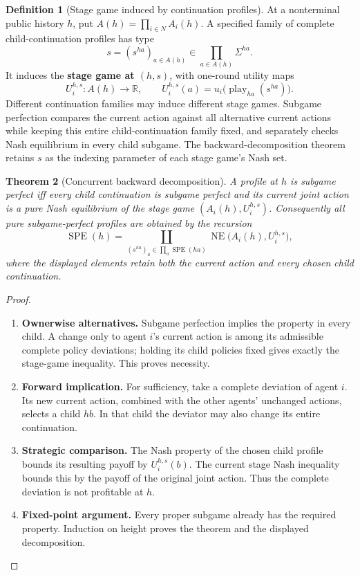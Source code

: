 \documentclass[11pt,a4paper]{article}
\numberwithin{equation}{section}
\newtheorem{theorem}{Theorem}[section]
\theoremstyle{definition}
\newtheorem{definition}[theorem]{Definition}
\theoremstyle{remark}
\theoremstyle{plain}
\begin{document}
\begin{definition}[Stage game induced by continuation profiles]
\label{def:egt-stage-game-induced-by-continuation-profiles}
At a nonterminal public history $h$, put
$A(h)=\prod_{i\in N}A_i(h)$. A specified family of complete
child-continuation profiles has type
\[
 s=(s^{ha})_{a\in A(h)}\in\prod_{a\in A(h)}\Sigma^{ha}.
\]
It induces the \textbf{stage game at $(h,s)$}, with one-round utility
maps
\[
 U_i^{h,s}:A(h)\longrightarrow\mathbb R,\qquad
 U_i^{h,s}(a)=u_i\bigl(\operatorname{play}_{ha}(s^{ha})\bigr).
\]
Different continuation families may induce different stage games.
Subgame perfection compares the current action against all alternative
current actions while keeping this entire child-continuation family
fixed, and separately checks Nash equilibrium in every child subgame.
The backward-decomposition theorem retains $s$ as the indexing
parameter of each stage game's Nash set.
\end{definition}
\begin{theorem}[Concurrent backward decomposition]
\label{thm:egt-concurrent-backward}
A profile at $h$ is subgame perfect iff every child continuation is
subgame perfect and its current joint action is a pure Nash
equilibrium of the stage game $(A_i(h),U_i^{h,s})$. Consequently all
pure subgame-perfect profiles are obtained by the recursion
\[
 \operatorname{SPE}(h)=
 \coprod_{(s^{ha})_a\in\prod_a\operatorname{SPE}(ha)}
       \operatorname{NE}\bigl(A_i(h),U_i^{h,s}\bigr),
\]
where the displayed elements retain both the current action and
every chosen child continuation.
\end{theorem}
\begin{proof}
\leavevmode
\begin{enumerate}[label=\textup{(\arabic*)},leftmargin=*,itemsep=4pt,topsep=3pt]
  \item \textbf{Ownerwise alternatives.} Subgame perfection implies the property in every child. A change
only to agent $i$'s current action is among its admissible complete
policy deviations; holding its child policies fixed gives exactly
the stage-game inequality. This proves necessity.
  \item \textbf{Forward implication.} For sufficiency, take a complete deviation of agent $i$. Its new
current action, combined with the other agents' unchanged actions,
selects a child $hb$. In that child the deviator may also change
its entire continuation.
  \item \textbf{Strategic comparison.} The Nash property of the chosen child
profile bounds its resulting payoff by $U_i^{h,s}(b)$. The current
stage Nash inequality bounds this by the payoff of the original
joint action. Thus the complete deviation is not profitable at $h$.
  \item \textbf{Fixed-point argument.} Every proper subgame already has the required property. Induction
on height proves the theorem and the displayed decomposition.
\end{enumerate}
\end{proof}
\end{document}

